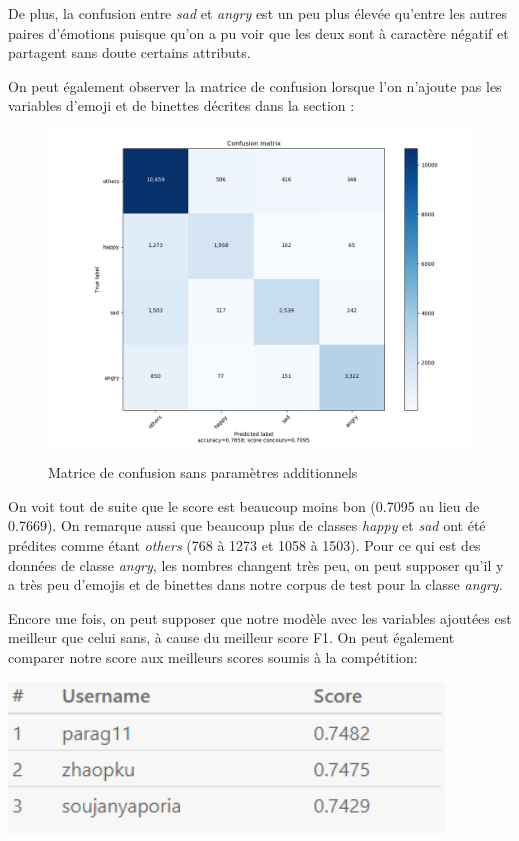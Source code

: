 De plus, la confusion entre \emph{sad} et \emph{angry} est un peu plus élevée qu'entre les autres paires d'émotions puisque qu'on a pu voir que les deux sont à caractère négatif et partagent sans doute certains attributs.

On peut également observer la matrice de confusion lorsque l'on n'ajoute pas les variables d'emoji et de binettes décrites dans la section :

\begin{figure}
	\caption{Matrice de confusion sans paramètres additionnels}
	\centering
	\includegraphics[width=\linewidth,keepaspectratio]{images/confusion_matrix_sans_features}
	\label{fig:partial_confusion}
\end{figure}

On voit tout de suite que le score est beaucoup moins bon (0.7095 au lieu de 0.7669). On remarque aussi que beaucoup plus de classes \emph{happy} et \emph{sad} ont été prédites comme étant \emph{others} (768 à 1273 et 1058 à 1503). Pour ce qui est des données de classe \emph{angry}, les nombres changent très peu, on peut  supposer qu'il y a très peu d'emojis et de binettes dans notre corpus de test pour la classe \emph{angry}.

Encore une fois, on peut supposer que notre modèle avec les variables ajoutées est meilleur que celui sans, à cause du meilleur score F1. On peut également comparer notre score aux meilleurs scores soumis à la compétition:

\includegraphics[width=\linewidth,height=4cm,keepaspectratio]{images/meilleurs_scores}


